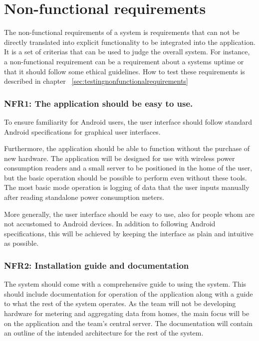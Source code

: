 \section{Non-functional requirements}
The non-functional requirements of a system is requirements that can not be directly translated into explicit functionality to be integrated into the application. It is a set of criterias that can be used to judge the overall system. For instance, a non-functional requirement can be a requirement about a systems uptime or that it should follow some ethical guidelines. How to test these requirements is described in chapter ~\ref{sec:testingnonfunctionalrequirements} 

\subsubsection{NFR1: The application should be easy to use.}
To ensure familiarity for Android users, the user interface should follow standard Android specifications for graphical user interfaces.
 
Furthermore, the application should be able to function without the purchase of new hardware. The application will be designed for use with wireless power consumption readers and a small server to be positioned in the home of the user, but the basic operation should be possible to perform even without these tools. The most basic mode operation is logging of data that 
the user inputs manually after reading standalone power consumption meters.
 
More generally, the user interface should be easy to use, also for people whom are not accustomed to Android devices. In 
addition to following Android specifications, this will be achieved by keeping the interface as plain and intuitive as possible.

\subsubsection{NFR2: Installation guide and documentation}
The system should come with a comprehensive guide to using the system. This should include documentation for operation of the
application along with a guide to what the rest of the system operates. As the team will not be developing hardware for metering and 
aggregating data from homes, the main focus will be on the application and the team's central server. The documentation will contain an outline 
of the intended architecture for the rest of the system.


